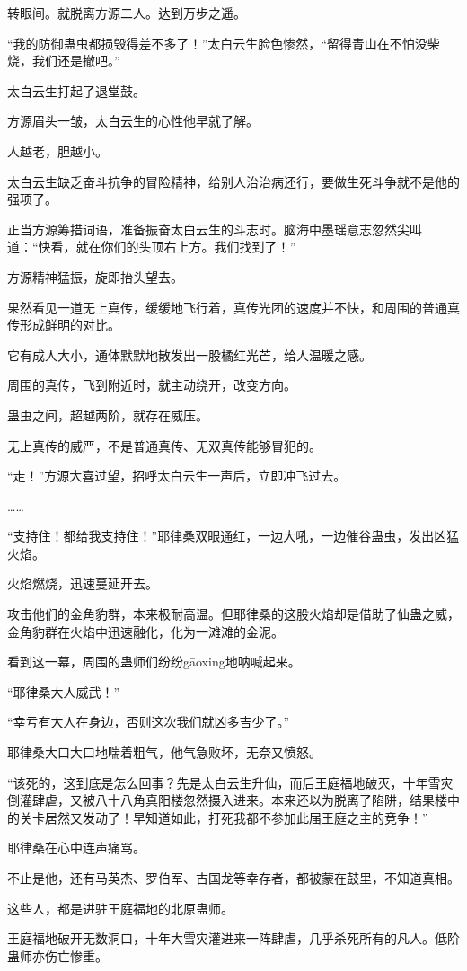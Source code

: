 \begin{this_body}
转眼间。就脱离方源二人。达到万步之遥。

“我的防御蛊虫都损毁得差不多了！”太白云生脸色惨然，“留得青山在不怕没柴烧，我们还是撤吧。”

太白云生打起了退堂鼓。

方源眉头一皱，太白云生的心性他早就了解。

人越老，胆越小。

太白云生缺乏奋斗抗争的冒险精神，给别人治治病还行，要做生死斗争就不是他的强项了。

正当方源筹措词语，准备振奋太白云生的斗志时。脑海中墨瑶意志忽然尖叫道：“快看，就在你们的头顶右上方。我们找到了！”

方源精神猛振，旋即抬头望去。

果然看见一道无上真传，缓缓地飞行着，真传光团的速度并不快，和周围的普通真传形成鲜明的对比。

它有成人大小，通体默默地散发出一股橘红光芒，给人温暖之感。

周围的真传，飞到附近时，就主动绕开，改变方向。

蛊虫之间，超越两阶，就存在威压。

无上真传的威严，不是普通真传、无双真传能够冒犯的。

“走！”方源大喜过望，招呼太白云生一声后，立即冲飞过去。

……

“支持住！都给我支持住！”耶律桑双眼通红，一边大吼，一边催谷蛊虫，发出凶猛火焰。

火焰燃烧，迅速蔓延开去。

攻击他们的金角豹群，本来极耐高温。但耶律桑的这股火焰却是借助了仙蛊之威，金角豹群在火焰中迅速融化，化为一滩滩的金泥。

看到这一幕，周围的蛊师们纷纷gāoxing地呐喊起来。

“耶律桑大人威武！”

“幸亏有大人在身边，否则这次我们就凶多吉少了。”

耶律桑大口大口地喘着粗气，他气急败坏，无奈又愤怒。

“该死的，这到底是怎么回事？先是太白云生升仙，而后王庭福地破灭，十年雪灾倒灌肆虐，又被八十八角真阳楼忽然摄入进来。本来还以为脱离了陷阱，结果楼中的关卡居然又发动了！早知道如此，打死我都不参加此届王庭之主的竞争！”

耶律桑在心中连声痛骂。

不止是他，还有马英杰、罗伯军、古国龙等幸存者，都被蒙在鼓里，不知道真相。

这些人，都是进驻王庭福地的北原蛊师。

王庭福地破开无数洞口，十年大雪灾灌进来一阵肆虐，几乎杀死所有的凡人。低阶蛊师亦伤亡惨重。


\end{this_body}
